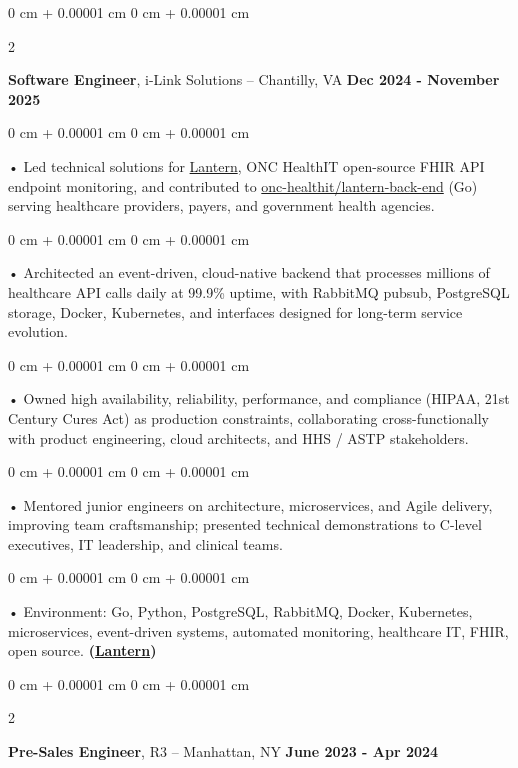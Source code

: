 \documentclass[10pt, letterpaper]{article}
\newenvironment{onecolentry}{
    \begin{adjustwidth}{
        0 cm + 0.00001 cm
    }{
        0 cm + 0.00001 cm
    }
}{
    \end{adjustwidth}
} %
\newenvironment{twocolentry}[2][]{
    \onecolentry
    \def\secondColumn{#2}
    \setcolumnwidth{\fill, 4.5 cm}
    \begin{paracol}{2}
}{
    \switchcolumn \raggedleft \secondColumn
    \end{paracol}
    \endonecolentry
} %
\begin{document}
        \vspace{0.1cm}

        \begin{twocolentry}{
            \textbf{Dec 2024 - November 2025}
        }
            \textbf{Software Engineer}, i-Link Solutions -- Chantilly, VA\end{twocolentry}


        \begin{onecolentry}
             • Led technical solutions for \href{https://lantern.healthit.gov/?tab=dashboard_tab}{Lantern}, ONC HealthIT open-source FHIR API endpoint monitoring, and contributed to \href{https://github.com/onc-healthit/lantern-back-end}{onc-healthit/lantern-back-end} (Go) serving healthcare providers, payers, and government health agencies.
        \end{onecolentry}
        \begin{onecolentry}
             • Architected an event-driven, cloud-native backend that processes millions of healthcare API calls daily at 99.9\% uptime, with RabbitMQ pubsub, PostgreSQL storage, Docker, Kubernetes, and interfaces designed for long-term service evolution.
        \end{onecolentry}
        \begin{onecolentry}
             • Owned high availability, reliability, performance, and compliance (HIPAA, 21st Century Cures Act) as production constraints, collaborating cross-functionally with product engineering, cloud architects, and HHS / ASTP stakeholders.
        \end{onecolentry}
        \begin{onecolentry}
             • Mentored junior engineers on architecture, microservices, and Agile delivery, improving team craftsmanship; presented technical demonstrations to C-level executives, IT leadership, and clinical teams.
        \end{onecolentry}
        \begin{onecolentry}
             • Environment: Go, Python, PostgreSQL, RabbitMQ, Docker, Kubernetes, microservices, event-driven systems, automated monitoring, healthcare IT, FHIR, open source. \textbf{(\href{https://lantern.healthit.gov/?tab=dashboard_tab}{Lantern})}
        \end{onecolentry}
        \vspace{0.1cm}

        \begin{twocolentry}{
            \textbf{June 2023 - Apr 2024}
        }
            \textbf{Pre-Sales Engineer}, R3 -- Manhattan, NY\end{twocolentry}
\end{document}
